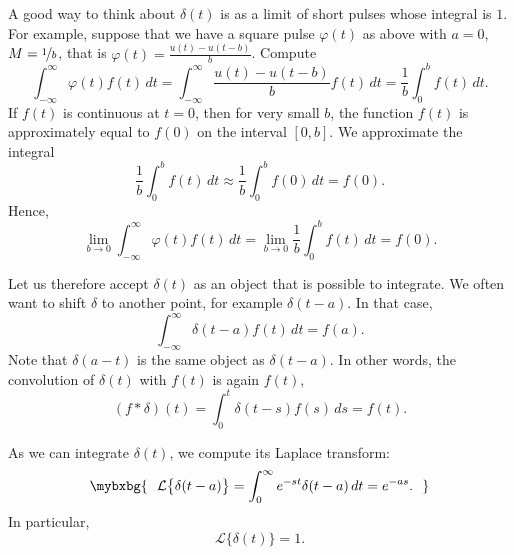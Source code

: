 A good way to think about $\delta(t)$ is as a limit of short pulses
whose integral is $1$.  For example, suppose that
we have a square pulse $\varphi(t)$ as above with $a=0$,
$M=\nicefrac{1}{b}$, that is $\varphi(t) = \frac{u(t) - u(t-b)}{b}$.
Compute
\begin{equation*}
\int_{-\infty}^\infty \varphi(t) f(t) \,dt =
\int_{-\infty}^\infty \frac{u(t) - u(t-b)}{b} f(t) \,dt =
\frac{1}{b} \int_{0}^b f(t) \,dt .
\end{equation*}
If $f(t)$ is continuous at $t=0$, then
for very small $b$, the function $f(t)$ is approximately equal to $f(0)$ on
the interval $[0,b]$.  We approximate the integral
\begin{equation*}
\frac{1}{b} \int_{0}^b f(t) \,dt \approx
\frac{1}{b} \int_{0}^b f(0) \,dt = f(0) .
\end{equation*}
Hence,
\begin{equation*}
\lim_{b\to 0}
\int_{-\infty}^\infty \varphi(t) f(t) \,dt =
\lim_{b\to 0}
\frac{1}{b} \int_{0}^b f(t) \,dt  = f(0) .
\end{equation*}

Let us therefore accept $\delta(t)$ as an object that is possible to
integrate.  We often want to shift $\delta$ to another point, for example
$\delta(t-a)$.  In that case,
\begin{equation*}
\int_{-\infty}^\infty \delta(t-a) f(t) \,dt = f(a) .
\end{equation*}
Note that $\delta(a-t)$ is the same object as $\delta(t-a)$.
In other words, the convolution of $\delta(t)$ with $f(t)$ is again $f(t)$,
\begin{equation*}
(f * \delta) (t) = 
\int_{0}^t \delta(t-s) f(s) \,ds
= f(t) .
\end{equation*}

As we can integrate $\delta(t)$, we compute its Laplace transform:
\begin{equation*}
\mybxbg{~~
{\mathcal{L}} \bigl\{ \delta(t-a) \bigr\}
=
\int_{0}^\infty e^{-st} \delta(t-a) \,dt = e^{-as} .
~~}
\end{equation*}
In particular,
\begin{equation*}
{\mathcal{L}} \bigl\{ \delta(t) \bigr\} = 1 .
\end{equation*}

